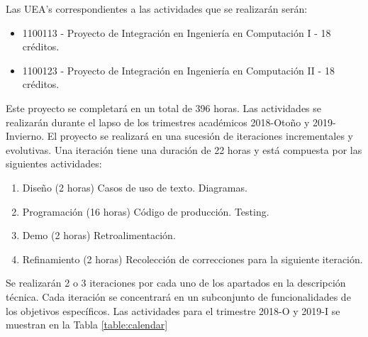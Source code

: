 Las UEA's correspondientes a las actividades que se realizar\'an serán:
\begin{itemize}
	\item 1100113 - Proyecto de Integración en Ingeniería en Computación I - 18 créditos.
	\item 1100123 - Proyecto de Integración en Ingeniería en Computación II - 18 créditos.
\end{itemize} 
 Este proyecto se completar\'a en un total de 396 horas. Las actividades se realizar\'an durante el lapso de los trimestres académicos 2018-Otoño y 2019-Invierno. El proyecto se realizará en una sucesión de iteraciones incrementales y evolutivas. Una iteración tiene una duración de 22 horas y est\'a compuesta por las siguientes actividades: 
\begin{enumerate}
	\item Diseño (2 horas)
	\subitem Casos de uso de texto.
	\subitem Diagramas.
	\item Programación (16 horas)
	\subitem Código de producción.
	\subitem Testing.
	\item Demo (2 horas)
	\subitem Retroalimentación.
	\item Refinamiento (2 horas)
	\subitem Recolección de correcciones para la siguiente iteración.
\end{enumerate}

Se realizarán 2 o 3 iteraciones por cada uno de los apartados en la descripción técnica. Cada iteración se concentrará en un subconjunto de funcionalidades de los objetivos específicos. 
Las actividades para el trimestre 2018-O y 2019-I se muestran en la Tabla \ref{table:calendar}

\newcommand\rownumber{\stepcounter{iteracion}\arabic{iteracion}}





